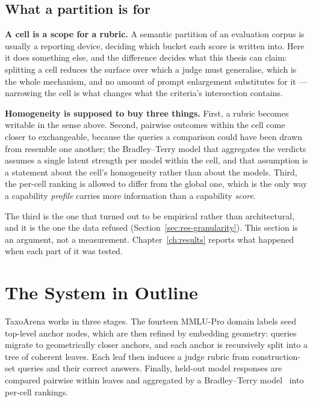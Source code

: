 \subsection*{What a partition is for}\label{sec:problem-statement}

\textbf{A cell is a scope for a rubric.} A semantic partition of an
evaluation corpus is usually a reporting device, deciding which bucket
each score is written into. Here it does something else, and the
difference decides what this thesis can claim: splitting a cell
reduces the surface over which a judge must generalise, which is the
whole mechanism, and no amount of prompt enlargement substitutes for
it --- narrowing the cell is what changes what the criteria's
intersection contains.

\textbf{Homogeneity is supposed to buy three things.} First, a rubric
becomes writable in the sense above. Second, pairwise outcomes within
the cell come closer to exchangeable, because the queries a comparison
could have been drawn from resemble one another; the Bradley--Terry
model that aggregates the verdicts assumes a single latent strength per
model within the cell, and that assumption is a statement about the
cell's homogeneity rather than about the models. Third, the per-cell
ranking is allowed to differ from the global one, which is the only way
a capability \emph{profile} carries more information than a capability
\emph{score}.

The third is the one that turned out to be empirical rather than
architectural, and it is the one the data refused
(Section~\ref{sec:res-granularity}). This section is an argument, not a
measurement. Chapter~\ref{ch:results} reports what happened when each
part of it was tested.

\section{The System in Outline}\label{sec:approach}

TaxoArena works in three stages. The fourteen MMLU-Pro domain labels
seed top-level anchor nodes, which are then refined by embedding
geometry: queries migrate to geometrically closer anchors, and each
anchor is recursively split into a tree of coherent leaves. Each leaf
then induces a judge rubric from construction-set queries and their
correct answers. Finally, held-out model responses are compared
pairwise within leaves and aggregated by a Bradley--Terry
model~\parencite{bradley1952rank,hunter2004mm} into per-cell rankings.

